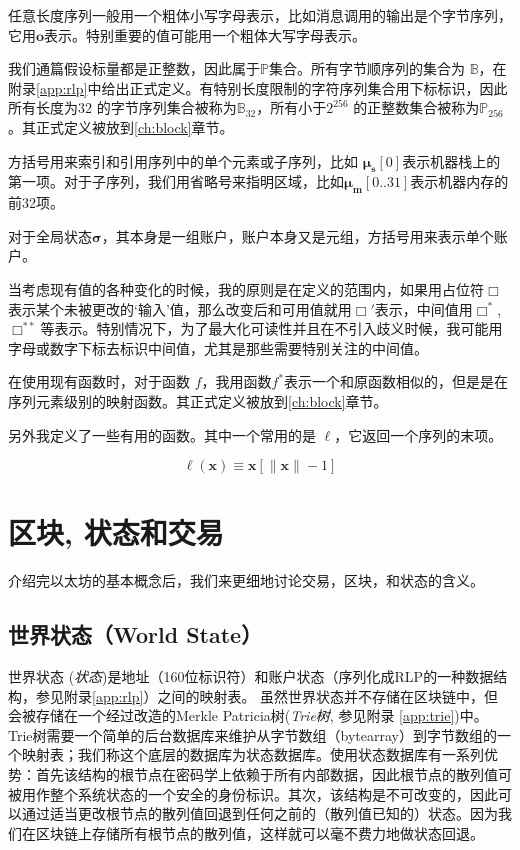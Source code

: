 \documentclass[UTF8,nofonts]{ctexart}
\begin{document}
\begin{multicols}{2}
任意长度序列一般用一个粗体小写字母表示，比如消息调用的输出是个字节序列，它用$\mathbf{o}$表示。特别重要的值可能用一个粗体大写字母表示。

我们通篇假设标量都是正整数，因此属于$\mathbb{P}$集合。所有字节顺序列的集合为 $\mathbb{B}$，在附录\ref{app:rlp}中给出正式定义。有特别长度限制的字符序列集合用下标标识，因此所有长度为$32$ 的字节序列集合被称为$\mathbb{B}_{32}$，所有小于$2^{256}$ 的正整数集合被称为$\mathbb{P}_{256}$。其正式定义被放到\ref{ch:block}章节。

方括号用来索引和引用序列中的单个元素或子序列，比如 $\boldsymbol{\mu}_\mathbf{s}[0]$表示机器栈上的第一项。对于子序列，我们用省略号来指明区域，比如$\boldsymbol{\mu}_\mathbf{m}[0..31]$表示机器内存的前32项。

对于全局状态$\boldsymbol{\sigma}$，其本身是一组账户，账户本身又是元组，方括号用来表示单个账户。


当考虑现有值的各种变化的时候，我的原则是在定义的范围内，如果用占位符$\Box$ 表示某个未被更改的`输入'值，那么改变后和可用值就用$\Box'$表示，中间值用$\Box^*$,  $\Box^{**}$等表示。特别情况下，为了最大化可读性并且在不引入歧义时候，我可能用字母或数字下标去标识中间值，尤其是那些需要特别关注的中间值。

在使用现有函数时，对于函数 $f$，我用函数$f^*$表示一个和原函数相似的，但是是在序列元素级别的映射函数。其正式定义被放到\ref{ch:block}章节。

另外我定义了一些有用的函数。其中一个常用的是 $\ell$，它返回一个序列的末项。


\begin{equation}
\ell(\mathbf{x}) \equiv \mathbf{x}[\lVert \mathbf{x} \rVert - 1]
\end{equation}



\section{区块, 状态和交易} \label{ch:bst}

介绍完以太坊的基本概念后，我们来更细地讨论交易，区块，和状态的含义。


\subsection{世界状态（World State）} \label{ch:state}

世界状态 (\textit{状态})是地址（160位标识符）和账户状态（序列化成RLP的一种数据结构，参见附录\ref{app:rlp}）之间的映射表。 虽然世界状态并不存储在区块链中，但会被存储在一个经过改造的Merkle Patricia树(\textit{Trie树}, 参见附录 \ref{app:trie})中。Trie树需要一个简单的后台数据库来维护从字节数组（bytearray）到字节数组的一个映射表；我们称这个底层的数据库为状态数据库。使用状态数据库有一系列优势：首先该结构的根节点在密码学上依赖于所有内部数据，因此根节点的散列值可被用作整个系统状态的一个安全的身份标识。其次，该结构是不可改变的，因此可以通过适当更改根节点的散列值回退到任何之前的（散列值已知的）状态。因为我们在区块链上存储所有根节点的散列值，这样就可以毫不费力地做状态回退。


\end{multicols}
\end{document}
